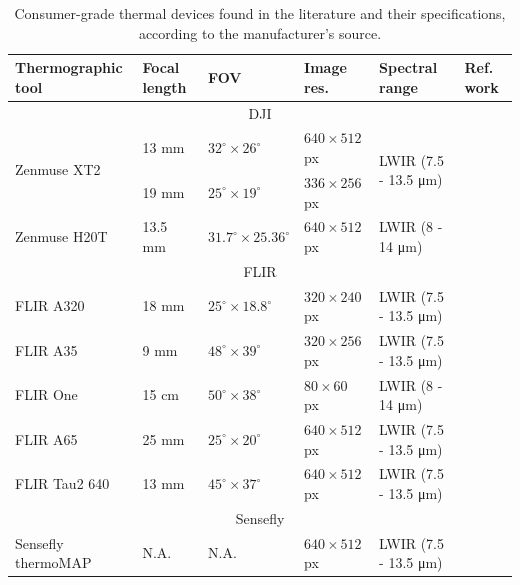 \renewcommand{\arraystretch}{1.2}
\begin{table}[htb]
    \caption{Consumer-grade thermal devices found in the literature and their specifications, according to the manufacturer's source.}
    \label{table:thermographic_devices}
    \begin{tabular}{llllll}
        \toprule
        Thermographic tool & Focal length & FOV & Image res. & Spectral range & Ref. work \\
        \midrule
        \multicolumn{6}{c}{DJI}\\
        \multirow{2}{*}{Zenmuse XT2}    & 13 \si{\milli\meter}   & $32^{\circ} \times 26^{\circ}$  & $640 \times 512$ px  & \multirow{2}{*}{LWIR (7.5 - 13.5 \si{\micro\meter})}    & \multirow{2}{*}{\cite{lopez_optimized_2021, yuan_uav-based_2021, jo_dense_2021}}\\
        & 19 \si{\milli\meter}   & $25^{\circ} \times 19^{\circ}$  & $336 \times 256$ px  &   & \\
        Zenmuse H20T     & 13.5 \si{\milli\meter}   & $31.7^{\circ} \times 25.36^{\circ}$  & $640 \times 512$ px  & LWIR (8 - 14 \si{\micro\meter})    & \cite{paziewska_integration_2022, jiang_diurnal_2022}\\
        \cmidrule{1-6}
        \multicolumn{6}{c}{FLIR}\\
        FLIR A320     & 18 \si{\milli\meter}   & $25^{\circ} \times 18.8^{\circ}$  & $320 \times 240$ px  & LWIR (7.5 - 13.5 \si{\micro\meter})    & \cite{guilbert_fusion_2020}\\
        FLIR A35     & 9 \si{\milli\meter}   & $48^{\circ} \times 39^{\circ}$  & $320 \times 256$ px  & LWIR (7.5 - 13.5 \si{\micro\meter})    & \cite{comba_2d_2019}\\
        FLIR One     & 15 \si{\centi\meter}   & $50^{\circ} \times 38^{\circ}$  & $80 \times 60$ px  & LWIR (8 - 14 \si{\micro\meter})    & \cite{javadnejad_photogrammetric_2020}\\
        FLIR A65     & 25 \si{\milli\meter}   & $25^{\circ} \times 20^{\circ}$  & $640 \times 512$ px  & LWIR (7.5 - 13.5 \si{\micro\meter})    & \cite{adan_fusion_2017, jarzabek-rychard_supervised_2020, lin_fusion_2019, westfeld_generation_2015}\\
        FLIR Tau2 640     & 13 \si{\milli\meter}   & $45^{\circ} \times 37^{\circ}$  & $640 \times 512$ px  & LWIR (7.5 - 13.5 \si{\micro\meter})    & \cite{boesch_thermal_2017, sledz_thermal_2018}\\
        \cmidrule{1-6}
        \multicolumn{6}{c}{Sensefly}\\
        Sensefly thermoMAP     & N.A.   & N.A.  & $640 \times 512$ px  & LWIR (7.5 - 13.5 \si{\micro\meter})    & \cite{padua_vineyard_2019}\\
        \bottomrule
    \end{tabular}
\end{table}
\renewcommand{\arraystretch}{1}

